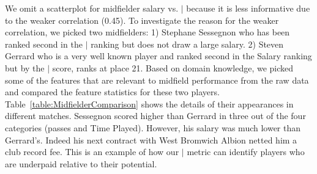 {We omit a scatterplot for midfielder salary vs. $\mid$ because it is less informative due to the weaker  correlation (0.45).
%
To investigate the reason for the weaker correlation, we picked two midfielders: 1) Stephane Sessegnon  who has been ranked second in the $\mid$ ranking but does not draw a large salary. 2) Steven Gerrard who is a very well known player and ranked second in the Salary ranking but by the $\mid$ score, ranks at place 21. Based on domain knowledge, we picked some of the features that are relevant to midfield performance from the raw data and compared the feature statistics for these two players. Table~\ref{table:MidfielderComparison} shows the details of their appearances in different matches. Sessegnon scored higher than Gerrard in three out of the four categories (passes and Time Played). However, his salary was much lower than Gerrard's. Indeed his next contract with West Bromwich Albion netted him a club record fee. This is an example of how our $\mid$ metric can identify players who are underpaid relative to their potential.
		\begin{table}[htbp]
			
			\centering
\end{table}}
